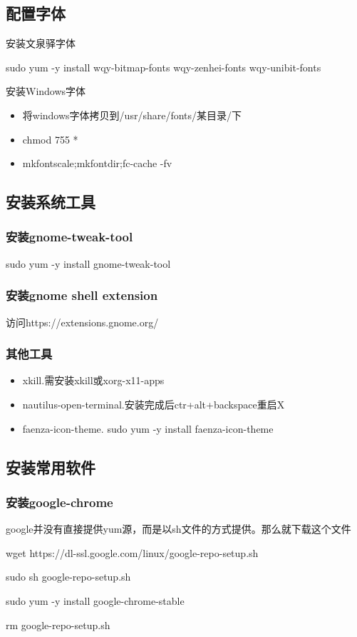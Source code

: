 \subsection{配置字体}
安装文泉驿字体
\begin{shellcmd}
sudo yum -y install wqy-bitmap-fonts wqy-zenhei-fonts wqy-unibit-fonts
\end{shellcmd}
安装Windows字体
\begin{itemize}
\item 将windows字体拷贝到/usr/share/fonts/某目录/下
\item chmod 755 *
\item mkfontscale;mkfontdir;fc-cache -fv
\end{itemize}

\subsection{安装系统工具}
\subsubsection{安装gnome-tweak-tool}
\begin{shellcmd}
sudo yum -y install gnome-tweak-tool
\end{shellcmd}
\subsubsection{安装gnome shell extension}
访问https://extensions.gnome.org/
\subsubsection{其他工具}
\begin{itemize}
\item xkill.需安装xkill或xorg-x11-apps
\item nautilus-open-terminal.安装完成后ctr+alt+backspace重启X
\item faenza-icon-theme.
sudo yum -y install faenza-icon-theme
\end{itemize}

\subsection{安装常用软件}
\subsubsection{安装google-chrome}
google并没有直接提供yum源，而是以sh文件的方式提供。那么就下载这个文件
\begin{shellcmd}
wget https://dl-ssl.google.com/linux/google-repo-setup.sh

sudo sh google-repo-setup.sh 

sudo yum -y install google-chrome-stable

rm google-repo-setup.sh 
\end{shellcmd}
